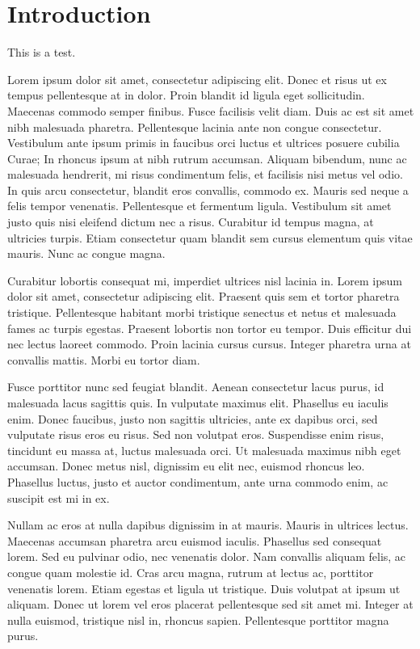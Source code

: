 \documentclass[notitlepage]{article}
\begin{document}
    \section*{Introduction}
    This is a test.


Lorem ipsum dolor sit amet, consectetur adipiscing elit. Donec et risus ut ex tempus pellentesque at in dolor. Proin blandit id ligula eget sollicitudin. Maecenas commodo semper finibus. Fusce facilisis velit diam. Duis ac est sit amet nibh malesuada pharetra. Pellentesque lacinia ante non congue consectetur. Vestibulum ante ipsum primis in faucibus orci luctus et ultrices posuere cubilia Curae; In rhoncus ipsum at nibh rutrum accumsan. Aliquam bibendum, nunc ac malesuada hendrerit, mi risus condimentum felis, et facilisis nisi metus vel odio. In quis arcu consectetur, blandit eros convallis, commodo ex. Mauris sed neque a felis tempor venenatis. Pellentesque et fermentum ligula. Vestibulum sit amet justo quis nisi eleifend dictum nec a risus. Curabitur id tempus magna, at ultricies turpis. Etiam consectetur quam blandit sem cursus elementum quis vitae mauris. Nunc ac congue magna.

Curabitur lobortis consequat mi, imperdiet ultrices nisl lacinia in. Lorem ipsum dolor sit amet, consectetur adipiscing elit. Praesent quis sem et tortor pharetra tristique. Pellentesque habitant morbi tristique senectus et netus et malesuada fames ac turpis egestas. Praesent lobortis non tortor eu tempor. Duis efficitur dui nec lectus laoreet commodo. Proin lacinia cursus cursus. Integer pharetra urna at convallis mattis. Morbi eu tortor diam.

Fusce porttitor nunc sed feugiat blandit. Aenean consectetur lacus purus, id malesuada lacus sagittis quis. In vulputate maximus elit. Phasellus eu iaculis enim. Donec faucibus, justo non sagittis ultricies, ante ex dapibus orci, sed vulputate risus eros eu risus. Sed non volutpat eros. Suspendisse enim risus, tincidunt eu massa at, luctus malesuada orci. Ut malesuada maximus nibh eget accumsan. Donec metus nisl, dignissim eu elit nec, euismod rhoncus leo. Phasellus luctus, justo et auctor condimentum, ante urna commodo enim, ac suscipit est mi in ex.

Nullam ac eros at nulla dapibus dignissim in at mauris. Mauris in ultrices lectus. Maecenas accumsan pharetra arcu euismod iaculis. Phasellus sed consequat lorem. Sed eu pulvinar odio, nec venenatis dolor. Nam convallis aliquam felis, ac congue quam molestie id. Cras arcu magna, rutrum at lectus ac, porttitor venenatis lorem. Etiam egestas et ligula ut tristique. Duis volutpat at ipsum ut aliquam. Donec ut lorem vel eros placerat pellentesque sed sit amet mi. Integer at nulla euismod, tristique nisl in, rhoncus sapien. Pellentesque porttitor magna purus.
\end{document}
